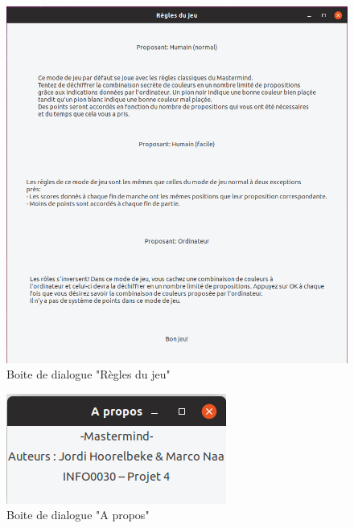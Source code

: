 \documentclass[a4paper, 11pt, oneside]{article}
\begin{document}
\begin{figure}[H] 
    \center
        \includegraphics[scale=0.3]{images_rapport/reglesdujeu.png}  
        \caption{Boite de dialogue "Règles du jeu"}
\end{figure}
\begin{figure}[H] 
    \center
        \includegraphics[scale=0.7]{images_rapport/apropos.png}  
        \caption{Boite de dialogue "A propos"}
\end{figure}
\end{document}
